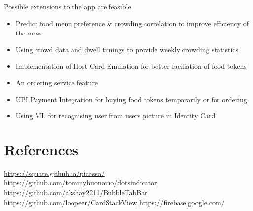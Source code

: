 \documentclass[12pt]{article}
\begin{document}
{\justify
Possible extensions to the app are feasible

\begin{itemize}
\item Predict food menu preference \& crowding correlation to improve efficiency of the mess
\item Using crowd data and dwell timings to provide weekly crowding statistics
\item Implementation of Host-Card Emulation for better faciliation of food tokens
\item An ordering service feature
\item UPI Payment Integration for buying food tokens temporarily or for ordering
\item Using ML for recognising user from user\textquotesingle s picture in Identity Card
\end{itemize}
}

\section*{\LARGE{References}}
\begin{thebibliography}{widest entry} 
 \url{https://square.github.io/picasso/}
 \url{https://github.com/tommybuonomo/dotsindicator}
 \url{https://github.com/akshay2211/BubbleTabBar}
 \url{https://github.com/loopeer/CardStackView}
 \url{https://firebase.google.com/}
\end{thebibliography}   
\end{document}
